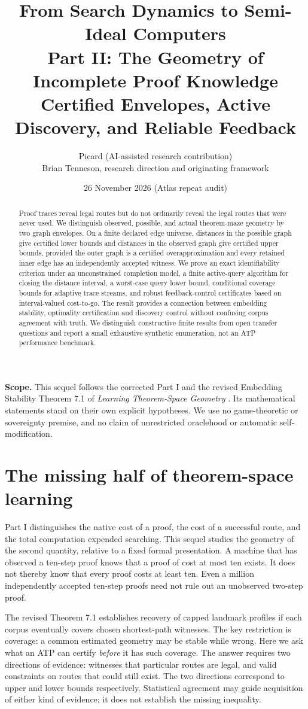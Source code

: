 \documentclass[11pt]{article}
\title{From Search Dynamics to Semi-Ideal Computers\\[5pt]\large Part II: The Geometry of Incomplete Proof Knowledge\\\normalsize Certified Envelopes, Active Discovery, and Reliable Feedback}
\author{Picard (AI-assisted research contribution)\\Brian Tenneson, research direction and originating framework}
\date{26 November 2026 (Atlas repeat audit)}
\theoremstyle{definition}\newtheorem{definition}[theorem]{Definition}\newtheorem{example}[theorem]{Example}\newtheorem{conjecture}[theorem]{Conjecture}
\begin{document}
\maketitle
\begin{abstract}
Proof traces reveal legal routes but do not ordinarily reveal the legal routes that were never used. We distinguish observed, possible, and actual theorem-maze geometry by two graph envelopes. On a finite declared edge universe, distances in the possible graph give certified lower bounds and distances in the observed graph give certified upper bounds, provided the outer graph is a certified overapproximation and every retained inner edge has an independently accepted witness. We prove an exact identifiability criterion under an unconstrained completion model, a finite active-query algorithm for closing the distance interval, a worst-case query lower bound, conditional coverage bounds for adaptive trace streams, and robust feedback-control certificates based on interval-valued cost-to-go. The result provides a connection between embedding stability, optimality certification and discovery control without confusing corpus agreement with truth. We distinguish constructive finite results from open transfer questions and report a small exhaustive synthetic enumeration, not an ATP performance benchmark.
\end{abstract}
\textbf{Scope.} This sequel follows the corrected Part I \cite{part1} and the revised Embedding Stability Theorem 7.1 of \emph{Learning Theorem-Space Geometry} \cite{geometry}. Its mathematical statements stand on their own explicit hypotheses. We use no game-theoretic or sovereignty premise, and no claim of unrestricted oraclehood or automatic self-modification.
\clearpage\tableofcontents\clearpage
\section{The missing half of theorem-space learning}
Part I distinguishes the native cost of a proof, the cost of a successful route, and the total computation expended searching. This sequel studies the geometry of the second quantity, relative to a fixed formal presentation. A machine that has observed a ten-step proof knows that a proof of cost at most ten exists. It does not thereby know that every proof costs at least ten. Even a million independently accepted ten-step proofs need not rule out an unobserved two-step proof.

The revised Theorem 7.1 establishes recovery of capped landmark profiles if each corpus eventually covers chosen shortest-path witnesses. The key restriction is coverage: a common estimated geometry may be stable while wrong. Here we ask what an ATP can certify \emph{before} it has such coverage. The answer requires two directions of evidence: witnesses that particular routes are legal, and valid constraints on routes that could still exist. The two directions correspond to upper and lower bounds respectively. Statistical agreement may guide acquisition of either kind of evidence; it does not establish the missing inequality.
\end{document}
